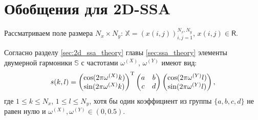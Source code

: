 \documentclass[specialist,
               substylefile = spbu.rtx,
               subf,href,colorlinks=true, 12pt]{disser}
\begin{document}

%

\newpage
\section{Обобщения для 2D-SSA}

Рассматриваем поле размера $N_x \times N_y$: $\mathbb{X}= \left(x(i,j) \right)_{i,j=1}^{N_x,N_y}$, $x(i,j) \in \mathsf{R}$.

Согласно разделу \ref{sec:2d_ssa_theory} главы \ref{sec:ssa_theory} элементы двумерной гармоники $\mathbb{S}$ с частотами $\omega^{(X)}$, $\omega^{(Y)}$ имеют вид:
\begin{gather} \label{eq:2d_cos_el}
\notag
s(k,l) =  \left(
\begin{matrix}
\cos(2\pi \omega^{(X)}k) \\ \notag
\sin(2\pi \omega^{(X)}k)
\end{matrix}
\right)^{\mathrm{T}}
 \left(
\begin{matrix}
a & b \\
c & d
\end{matrix}
\right)
 \left(
\begin{matrix}
\cos(2\pi \omega^{(Y)}l) \\ \notag
\sin(2\pi \omega^{(Y)}l)
\end{matrix}
\right),
\notag
\end{gather}
где $1 \leqslant k \leqslant N_x$, $1 \leqslant l \leqslant N_y$, хотя бы один коэффициент из  группы $\{a,b,c,d\}$ не равен нулю и
$\omega^{(X)}, \omega^{(Y)} \in (0,0.5)$.
\end{document}
